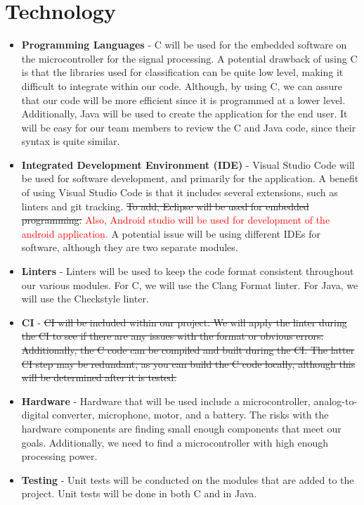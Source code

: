 \documentclass[12pt, titlepage]{article}
\begin{document}
\section{Technology}

\begin{itemize}
	\item \textbf{Programming Languages} - C will be used for the embedded software on the microcontroller for the signal processing. A potential drawback of using C is that the libraries used for classification can be quite low level, making it difficult to integrate within our code. Although, by using C, we can assure that our code will be more efficient since it is programmed at a lower level. Additionally, Java will be used to create the application for the end user. It will be easy for our team members to review the C and Java code, since their syntax is quite similar.
	\item \textbf{Integrated Development Environment (IDE)} - Visual Studio Code will be used for software development, and primarily for the application. A benefit of using Visual Studio Code is that it includes several extensions, such as linters and git tracking. \sout{To add, Eclipse will be used for embedded programming.} \textcolor{red}{Also, Android studio will be used for development of the android application.} A potential issue will be using different IDEs for software, although they are two separate modules.
	\item \textbf{Linters} - Linters will be used to keep the code format consistent throughout our various modules. For C, we will use the Clang Format linter. For Java, we will use the Checkstyle linter.
	\item \textbf{CI} - \sout{CI will be included within our project. We will apply the linter during the CI to see if there are any issues with the format or obvious errors. Additionally, the C code can be compiled and built during the CI. The latter CI step may be redundant, as you can build the C code locally, although this will be determined after it is tested.}
	\item \textbf{Hardware} - Hardware that will be used include a microcontroller, analog-to-digital converter, microphone, motor, and a battery. The risks with the hardware components are finding small enough components that meet our goals. Additionally, we need to find a microcontroller with high enough processing power.
	\item \textbf{Testing} - Unit tests will be conducted on the modules that are added to the project. Unit tests will be done in both C and in Java.
\end{itemize}
\end{document}
